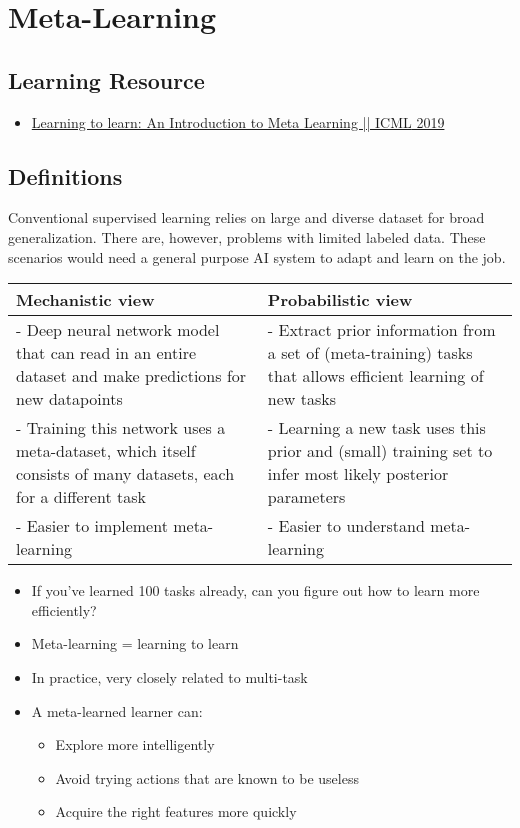 \chapter{Meta-Learning}

\section{Learning Resource}
\begin{itemize}
	\item \href{https://youtu.be/ByeRnmHJ-uk}{Learning to learn: An Introduction to Meta Learning || \ac{ICML} 2019}
\end{itemize}

\section{Definitions}
Conventional supervised learning relies on large and diverse dataset for broad generalization. There are, however, problems with limited labeled data. These scenarios would need a general purpose \ac{AI} system to adapt and learn on the job.

\begin{center}
	\begin{tabular}{p{8cm}|p{8cm}}
		Mechanistic view & Probabilistic view\\
		\hline\hline
		- Deep neural network model that can read in an entire dataset and make predictions for new datapoints  & - Extract prior information from a set of (meta-training) tasks that allows efficient learning of new tasks\\
		- Training this network uses a meta-dataset, which itself consists of many datasets, each for a different task & - Learning a new task uses this prior and (small) training set to infer most likely posterior parameters\\
		- Easier to implement meta-learning & - Easier to understand meta-learning
	\end{tabular}
\end{center}

\begin{itemize}
	\item If you’ve learned 100 tasks already, can you figure out how to learn more efficiently?
	\item Meta-learning = learning to learn
	\item In practice, very closely related to multi-task
	\item A meta-learned learner can:
	\begin{itemize}
		\item Explore more intelligently
		\item Avoid trying actions that are known to be useless
		\item Acquire the right features more quickly
	\end{itemize}
\end{itemize}

